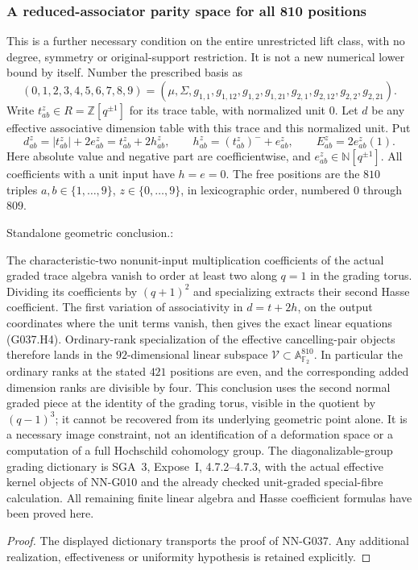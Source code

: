 \begin{geometricstatement}[NN-G037]
\subsubsection*{A reduced-associator parity space for all 810 positions}

This is a further necessary condition on the entire unrestricted lift
class, with no degree, symmetry or original-support restriction.
It is not a new numerical lower bound by itself.  Number the prescribed
basis as
\[
 (0,1,2,3,4,5,6,7,8,9)
 =(\mu,\Sigma,g_{1,1},g_{1,12},g_{1,2},g_{1,21},
                 g_{2,1},g_{2,12},g_{2,2},g_{2,21}).
\]
Write $t_{ab}^z\in R=\mathbb Z[q^{\pm1}]$ for its trace table,
with normalized unit $0$.  Let $d$ be any effective associative
dimension table with this trace and this normalized unit.  Put
\[
 d_{ab}^z=|t_{ab}^z|+2e_{ab}^z=t_{ab}^z+2h_{ab}^z,
 \qquad h_{ab}^z=(t_{ab}^z)^-+e_{ab}^z,
 \qquad E_{ab}^z=2e_{ab}^z(1).
\tag{G037.H1}
\]
Here absolute value and negative part are coefficientwise, and
$e_{ab}^z\in\mathbb N[q^{\pm1}]$.  All coefficients with a unit
input have $h=e=0$.  The free positions are the $810$ triples
$a,b\in\{1,\ldots,9\}$, $z\in\{0,\ldots,9\}$, in lexicographic
order, numbered $0$ through $809$.


Standalone geometric conclusion.:

The characteristic-two nonunit-input multiplication coefficients
of the actual graded trace algebra vanish to order at least two
along $q=1$ in the grading torus.  Dividing its coefficients by $(q+1)^2$ and
specializing extracts their second Hasse coefficient.  The
first variation of associativity in $d=t+2h$, on the output
coordinates where the unit terms vanish, then gives the exact
linear equations (G037.H4).  Ordinary-rank specialization of
the effective cancelling-pair objects therefore lands in the
$92$-dimensional linear subspace $\mathcal V\subset\mathbb A^{810}_{\mathbb F_2}$.
In particular the ordinary ranks at the stated $421$ positions
are even, and the corresponding added dimension ranks are
divisible by four.  This conclusion uses the second normal graded piece at the
identity of the grading torus, visible in the quotient by $(q-1)^3$;
it cannot be recovered from its underlying geometric point
alone.  It is a necessary image constraint, not an identification
of a deformation space or a computation of a full Hochschild
cohomology group.  The diagonalizable-group grading dictionary
is SGA~3, Expose~I, 4.7.2--4.7.3, with the actual effective
kernel objects of NN-G010 and the already checked unit-graded
special-fibre calculation.  All remaining finite linear
algebra and Hasse coefficient formulas have been proved here.


\end{geometricstatement}
\begin{proof} The displayed dictionary transports the proof of NN-G037. Any additional realization, effectiveness or uniformity hypothesis is retained explicitly.\end{proof}



